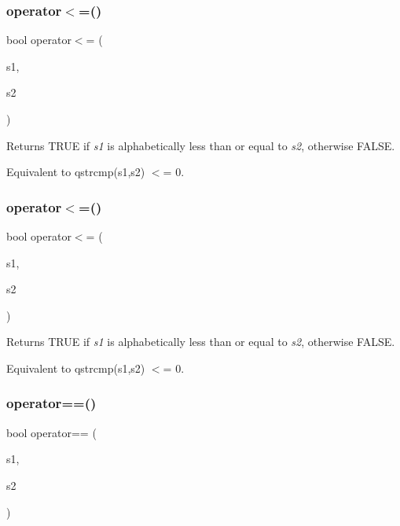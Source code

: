 \subsubsection{\texorpdfstring{operator$<$=()}{operator<=()}\hspace{0.1cm}{\footnotesize\ttfamily [1/2]}}
{\footnotesize\ttfamily bool operator$<$= (\begin{DoxyParamCaption}\item[{const char $\ast$}]{s1,  }\item[{const \mbox{\hyperlink{class_q_string}{Q\+String}} \&}]{s2 }\end{DoxyParamCaption})\hspace{0.3cm}{\ttfamily [related]}}

Returns T\+R\+UE if {\itshape s1} is alphabetically less than or equal to {\itshape s2}, otherwise F\+A\+L\+SE.

Equivalent to {\ttfamily qstrcmp(s1,s2) $<$= 0}. \mbox{\label{class_q_string_a12eb758cb95c371ba27ef75d82c2ec86}} 
\subsubsection{\texorpdfstring{operator$<$=()}{operator<=()}\hspace{0.1cm}{\footnotesize\ttfamily [2/2]}}
{\footnotesize\ttfamily bool operator$<$= (\begin{DoxyParamCaption}\item[{const \mbox{\hyperlink{class_q_string}{Q\+String}} \&}]{s1,  }\item[{const char $\ast$}]{s2 }\end{DoxyParamCaption})\hspace{0.3cm}{\ttfamily [related]}}

Returns T\+R\+UE if {\itshape s1} is alphabetically less than or equal to {\itshape s2}, otherwise F\+A\+L\+SE.

Equivalent to {\ttfamily qstrcmp(s1,s2) $<$= 0}. \mbox{\label{class_q_string_af13dfeb5517343bb511393c74f18a3b6}} 
\subsubsection{\texorpdfstring{operator==()}{operator==()}\hspace{0.1cm}{\footnotesize\ttfamily [1/3]}}
{\footnotesize\ttfamily bool operator== (\begin{DoxyParamCaption}\item[{const char $\ast$}]{s1,  }\item[{const \mbox{\hyperlink{class_q_string}{Q\+String}} \&}]{s2 }\end{DoxyParamCaption})\hspace{0.3cm}{\ttfamily [related]}}

